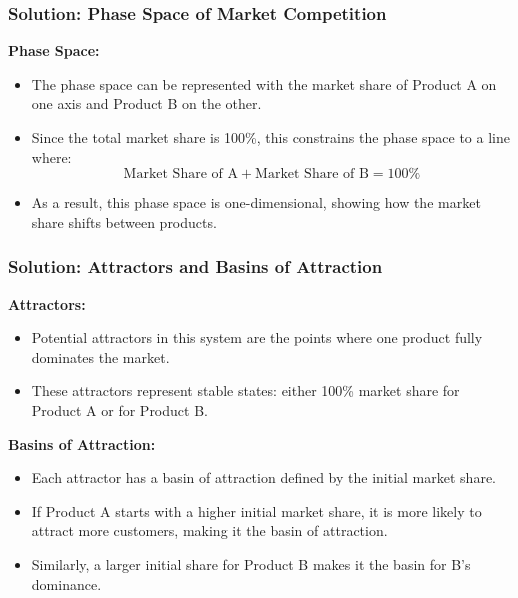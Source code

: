 \documentclass{beamer}
\begin{document}
\begin{frame}
    \frametitle{Solution: Phase Space of Market Competition}

    \textbf{Phase Space:}
    \begin{itemize}
        \item The phase space can be represented with the market share of Product A on one axis and Product B on the other.
        \item Since the total market share is 100\%, this constrains the phase space to a line where:
        \[
        \text{Market Share of A} + \text{Market Share of B} = 100\%
        \]
        \item As a result, this phase space is one-dimensional, showing how the market share shifts between products.
    \end{itemize}
\end{frame}

\begin{frame}
    \frametitle{Solution: Attractors and Basins of Attraction}

    \textbf{Attractors:}
    \begin{itemize}
        \item Potential attractors in this system are the points where one product fully dominates the market.
        \item These attractors represent stable states: either 100\% market share for Product A or for Product B.
    \end{itemize}

    \bigskip

    \textbf{Basins of Attraction:}
    \begin{itemize}
        \item Each attractor has a basin of attraction defined by the initial market share.
        \item If Product A starts with a higher initial market share, it is more likely to attract more customers, making it the basin of attraction.
        \item Similarly, a larger initial share for Product B makes it the basin for B's dominance.
    \end{itemize}
\end{frame}
\end{document}
